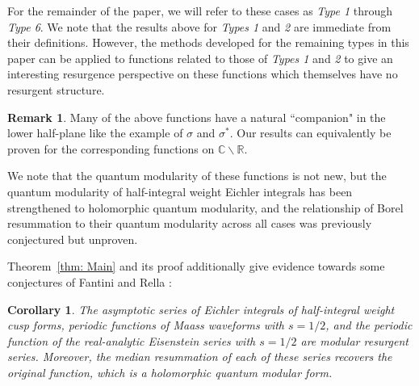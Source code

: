 \documentclass[12pt]{amsart}
\theoremstyle{definition}
\newtheorem*{remark}{Remark}
\theoremstyle{plain}
\newtheorem{cor}[theorem]{Corollary}
\numberwithin{equation}{section}
\begin{document}
For the remainder of the paper, we will refer to these cases as \emph{Type 1} through \emph{Type 6}. We note that the results above for \emph{Types 1} and \emph{2} are immediate from their definitions. However, the methods developed for the remaining types in this paper can be applied to functions related to those of \emph{Types 1} and \emph{2} to give an interesting resurgence perspective on these functions which themselves have no resurgent structure.

\begin{remark} 
Many of the above functions have a natural ``companion" in the lower half-plane like the example of $\sigma$ and $\sigma^*$. Our results can equivalently be proven for the corresponding functions on $\mathbb{C}\backslash\mathbb{R}$. 
\end{remark}


We note that the quantum modularity of these functions is not new, but the quantum modularity of half-integral weight Eichler integrals has been strengthened to holomorphic quantum modularity, and the relationship of Borel resummation to their quantum modularity across all cases was previously conjectured but unproven. 


Theorem~\ref{thm: Main} and its proof additionally give evidence towards some conjectures of Fantini and Rella \cite{fantini-rella}:

\begin{cor} \label{cor: conj}
The asymptotic series of Eichler integrals of half-integral weight cusp forms, periodic functions of Maass waveforms with $s=1/2$, and the periodic function of the real-analytic Eisenstein series with $s=1/2$ are modular resurgent series. Moreover, the median resummation of each of these series recovers the original function, which is a holomorphic quantum modular form. 
\end{cor}

 
\end{document}
